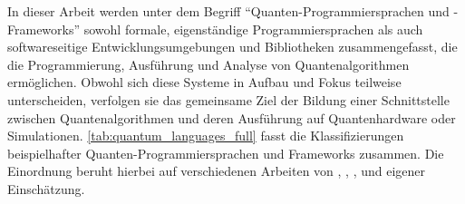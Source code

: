 In dieser Arbeit werden unter dem Begriff \enquote{Quanten-Programmiersprachen und -Frameworks} sowohl formale, eigenständige Programmiersprachen als auch softwareseitige Entwicklungsumgebungen und Bibliotheken zusammengefasst, die die Programmierung, Ausführung und Analyse von Quantenalgorithmen ermöglichen. Obwohl sich diese Systeme in Aufbau und Fokus teilweise unterscheiden, verfolgen sie das gemeinsame Ziel der Bildung einer Schnittstelle zwischen Quantenalgorithmen und deren Ausführung auf Quantenhardware oder Simulationen. \autoref{tab:quantum_languages_full} fasst die Klassifizierungen beispielhafter Quanten-Programmiersprachen und Frameworks zusammen. Die Einordnung beruht hierbei auf verschiedenen Arbeiten von \autocite{singhSurveyAvailableTools2024a}, \autocite{ferreiraExploratoryStudyUsage2025}, \autocite{garhwal_quantum_2021}, \autocite{serrano_quantum_2023} und eigener Einschätzung.

